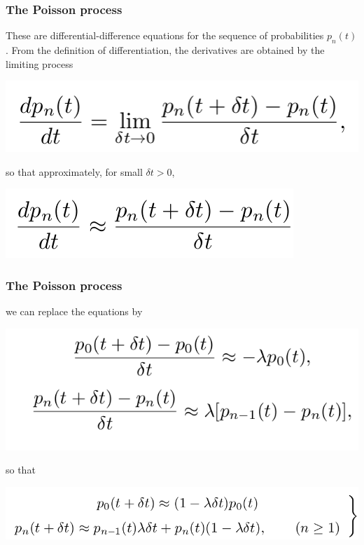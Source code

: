 \documentclass[spanish]{beamer}
\begin{document}
\begin{frame}
\frametitle{The Poisson process}
These are differential-difference equations for the sequence of probabilities $p_{n}(t)$. From the definition of differentiation, the derivatives are obtained by the limiting process

\begin{center}
\includegraphics[scale=0.4]{im12}
\end{center}
so that approximately, for small $\delta t > 0$,

\begin{center}
\includegraphics[scale=0.4]{im13}
\end{center}

\end{frame}
\begin{frame}
\frametitle{The Poisson process}
we can replace the equations by

\begin{center}
\includegraphics[scale=0.4]{im14}
\end{center}

so that

\begin{center}
\includegraphics[scale=0.4]{im15}
\end{center}

\end{frame}
\end{document}
